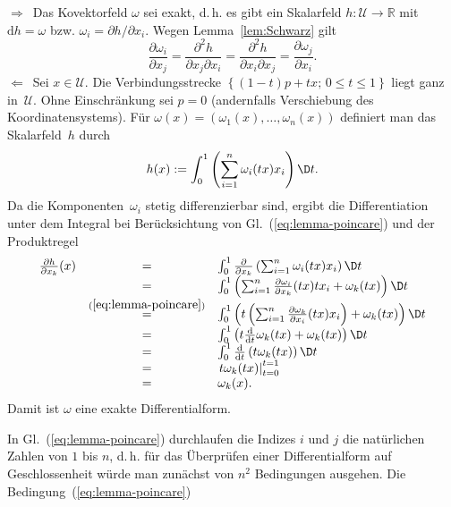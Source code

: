 \begin{svmultproof}
\glqq$\Rightarrow$\grqq\ Das Kovektorfeld $\omega$ sei exakt, d.\,h. es gibt
ein Skalarfeld $h:\mathcal{U}\to{\mathbb{R}}$ mit ${\mathrm{d}} h=\omega$ bzw. $\omega_{i}=\partial h/\partial x_{i}$.
Wegen Lemma~\ref{lem:Schwarz} gilt
\[
\frac{\partial\omega_{i}}{\partial x_{j}}=\frac{\partial^{2}h}{\partial x_{j}\partial x_{i}}=\frac{\partial^{2}h}{\partial x_{i}\partial x_{j}}=\frac{\partial\omega_{j}}{\partial x_{i}}.
\]
\glqq$\Leftarrow$\grqq\ Sei $x\in\mathcal{U}$. Die Verbindungsstrecke $\left\{ (1-t)p+tx;\,0\leq t\leq1\right\} $
liegt ganz in~$\mathcal{U}$. Ohne Einschränkung sei $p=0$ (andernfalls
Verschiebung des Koordinatensystems). Für $\omega(x)=(\omega_{1}(x),\ldots,\omega_{n}(x))$
definiert man das Skalarfeld~$h$ durch
\begin{equation}
h(x):=\int_{0}^{1}\left(\sum_{i=1}^{n}\omega_{i}(tx)x_{i}\right)\D t.\label{eq:potential-poincare}
\end{equation}
 Da die Komponenten~$\omega_{i}$ stetig differenzierbar sind, ergibt
die Differentiation unter dem Integral bei Berücksichtung von Gl.~(\ref{eq:lemma-poincare})
und der Produktregel
\[
\begin{array}{ccl}
\frac{\partial h}{\partial x_{k}}(x) & = & \int_{0}^{1}\frac{\partial}{\partial x_{k}}\left(\sum_{i=1}^{n}\omega_{i}(tx)x_{i}\right)\D t\\
 & = & \int_{0}^{1}\left(\sum_{i=1}^{n}\frac{\partial\omega_{i}}{\partial x_{k}}(tx)tx_{i}+\omega_{k}(tx)\right)\D t\\
 & \stackrel{(\ref{eq:lemma-poincare})}{=} & \int_{0}^{1}\left(t\left(\sum_{i=1}^{n}\frac{\partial\omega_{k}}{\partial x_{i}}(tx)x_{i}\right)+\omega_{k}(tx)\right)\D t\\
 & = & \int_{0}^{1}\left(t\frac{{\mathrm{d}}}{{\mathrm{d}} t}\omega_{k}(tx)+\omega_{k}(tx)\right)\D t\\
 & = & \int_{0}^{1}\frac{{\mathrm{d}}}{{\mathrm{d}} t}\left(t\omega_{k}(tx)\right)\D t\\
 & = & \left.t\omega_{k}(tx)\right|_{t=0}^{t=1}\\
 & = & \omega_{k}(x).
\end{array}
\]
Damit ist $\omega$ eine exakte Differentialform.
\end{svmultproof}
In Gl.~(\ref{eq:lemma-poincare}) durchlaufen die Indizes $i$ und
$j$ die natürlichen Zahlen von $1$ bis $n$, d.\,h. für das Überprüfen
einer Differentialform auf Geschlossenheit würde man zunächst von
$n^{2}$ Bedingungen ausgehen. Die Bedingung~(\ref{eq:lemma-poincare})
